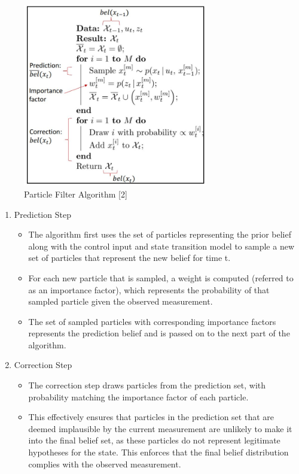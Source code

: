 \documentclass[twoside]{article}
\begin{document}
\begin{figure}[h]
    \begin{center}
    
    \includegraphics[width=0.5\linewidth, height=8cm]{particle_algorithm} 
    \caption{Particle Filter Algorithm [2]} 
    \label{fig: Particle Filter Algorithm (Lecture 11 Slides)}
     \end{center}

\end{figure}


\begin{enumerate}
    \item Prediction Step

    \begin{itemize}
        \item 
    
    The algorithm first uses the set of particles representing the prior belief along with the control input and state transition model to sample a new set of particles that represent the new belief for time t. 

        \item
    For each new particle that is sampled, a weight is computed (referred to as an importance factor), which represents the probability of that sampled particle given the observed measurement. 
        \item
    The set of sampled particles with corresponding importance factors represents the prediction belief and is passed on to the next part of the algorithm.
    
    \end{itemize}
\item Correction Step

 \begin{itemize}
        \item 
    The correction step draws particles from the prediction set, with probability matching the importance factor of each particle.  
        \item 
    This effectively ensures that particles in the prediction set that are deemed implausible by the current measurement are unlikely to make it into the final belief set, as these particles do not represent legitimate hypotheses for the state. This enforces that the final belief distribution complies with the observed measurement. 
    \end{itemize}

\end{enumerate}
\end{document}
